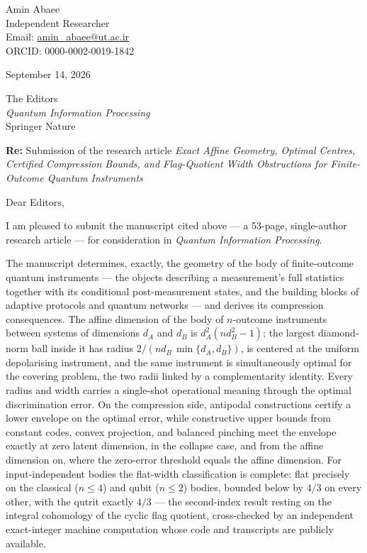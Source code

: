 \documentclass[10pt,a4paper]{article}
\begin{document}
\pagestyle{empty}

\noindent
\begin{minipage}[t]{0.60\textwidth}
Amin Abaee\\
Independent Researcher\\
Email: \href{mailto:amin\_abaee@ut.ac.ir}{amin\_abaee@ut.ac.ir}\\
ORCID: 0000-0002-0019-1842
\end{minipage}%
\hfill
\begin{minipage}[t]{0.36\textwidth}
\raggedleft
September 14, 2026
\end{minipage}

\vspace{1.0em}

\noindent The Editors\\
\emph{Quantum Information Processing}\\
Springer Nature

\vspace{1.0em}

\noindent\textbf{Re:} Submission of the research article \emph{Exact Affine Geometry, Optimal Centres, Certified Compression Bounds, and Flag-Quotient Width Obstructions for Finite-Outcome Quantum Instruments}

\vspace{1.0em}

\noindent Dear Editors,

I am pleased to submit the manuscript cited above --- a 53-page, single-author research article --- for consideration in \emph{Quantum Information Processing}.

The manuscript determines, exactly, the geometry of the body of finite-outcome quantum instruments --- the objects describing a measurement's full statistics together with its conditional post-measurement states, and the building blocks of adaptive protocols and quantum networks --- and derives its compression consequences. The affine dimension of the body of $n$-outcome instruments between systems of dimensions $d_A$ and $d_B$ is $d_A^2(nd_B^2-1)$; the largest diamond-norm ball inside it has radius $2/(nd_B\,\min\{d_A,d_B\})$, is centered at the uniform depolarising instrument, and the same instrument is simultaneously optimal for the covering problem, the two radii linked by a complementarity identity. Every radius and width carries a single-shot operational meaning through the optimal discrimination error. On the compression side, antipodal constructions certify a lower envelope on the optimal error, while constructive upper bounds from constant codes, convex projection, and balanced pinching meet the envelope exactly at zero latent dimension, in the collapse case, and from the affine dimension on, where the zero-error threshold equals the affine dimension. For input-independent bodies the flat-width classification is complete: flat precisely on the classical ($n\le 4$) and qubit ($n\le 2$) bodies, bounded below by $4/3$ on every other, with the qutrit exactly $4/3$ --- the second-index result resting on the integral cohomology of the cyclic flag quotient, cross-checked by an independent exact-integer machine computation whose code and transcripts are publicly available.
\end{document}
